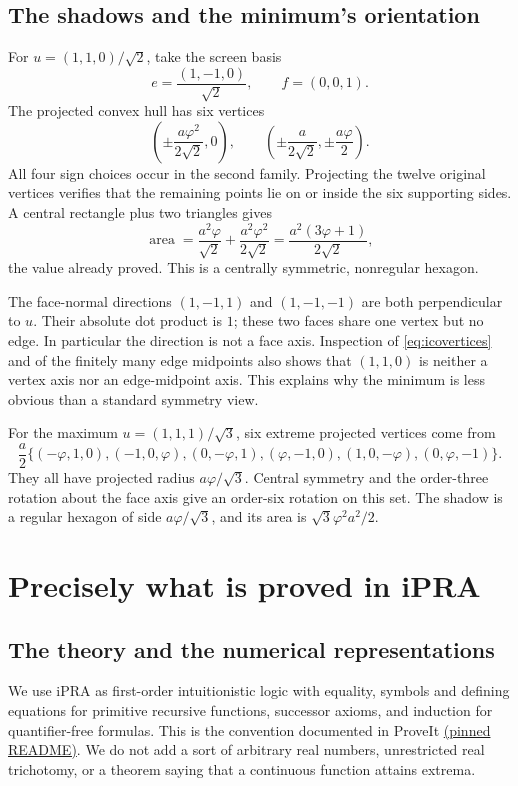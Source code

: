 \documentclass[11pt,a4paper]{article}
\newcommand{\ph}{\varphi}
\newcommand{\area}{\operatorname{area}}
\begin{document}
\subsection{The shadows and the minimum's orientation}
For $u=(1,1,0)/\sqrt2$, take the screen basis
\[
 e=\frac{(1,-1,0)}{\sqrt2},\qquad f=(0,0,1).
\]
The projected convex hull has six vertices
\begin{equation}\label{eq:icohex}
 \left(\pm\frac{a\ph^2}{2\sqrt2},0\right),\qquad
 \left(\pm\frac a{2\sqrt2},\pm\frac{a\ph}{2}\right).
\end{equation}
All four sign choices occur in the second family. Projecting the twelve original vertices verifies that the remaining points lie on or inside the six supporting sides. A central rectangle plus two triangles gives
\[
 \area=\frac{a^2\ph}{\sqrt2}+\frac{a^2\ph^2}{2\sqrt2}
       =\frac{a^2(3\ph+1)}{2\sqrt2},
\]
the value already proved. This is a centrally symmetric, nonregular hexagon.

The face-normal directions $(1,-1,1)$ and $(1,-1,-1)$ are both perpendicular to $u$. Their absolute dot product is $1$; these two faces share one vertex but no edge. In particular the direction is not a face axis. Inspection of \eqref{eq:icovertices} and of the finitely many edge midpoints also shows that $(1,1,0)$ is neither a vertex axis nor an edge-midpoint axis. This explains why the minimum is less obvious than a standard symmetry view.

For the maximum $u=(1,1,1)/\sqrt3$, six extreme projected vertices come from
\[
 \frac a2\{(-\ph,1,0),(-1,0,\ph),(0,-\ph,1),
             (\ph,-1,0),(1,0,-\ph),(0,\ph,-1)\}.
\]
They all have projected radius $a\ph/\sqrt3$. Central symmetry and the order-three rotation about the face axis give an order-six rotation on this set. The shadow is a regular hexagon of side $a\ph/\sqrt3$, and its area is $\sqrt3\ph^2a^2/2$.

\section{Precisely what is proved in iPRA}\label{sec:ipra}

\subsection{The theory and the numerical representations}
We use iPRA as first-order intuitionistic logic with equality, symbols and defining equations for primitive recursive functions, successor axioms, and induction for quantifier-free formulas. This is the convention documented in ProveIt \href{https://github.com/VladimirReshetnikov/ProveIt/blob/09fe17194da14cdd100947737952e44100bb71b8/Logic/PrimitiveRecursiveArithmetic/README.md}{(pinned README)}. We do not add a sort of arbitrary real numbers, unrestricted real trichotomy, or a theorem saying that a continuous function attains extrema.
\end{document}
